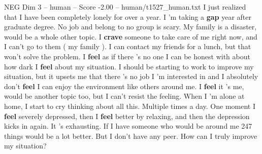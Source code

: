 \begin{textsample}{NEG Dim 3 – human – Score -2.00 – human/t1527\_human.txt}  \label{ex:f3_neg_036}
I just realized that I have been completely lonely for over a year.
I ’m taking a \textbf{gap} year after graduate degree.
No job and belong to no group is scary.
My family is a disaster, would be a whole other topic.
I \textbf{crave} someone to take care of me right now, and I can't go to them ( my family ).
I can contact my friends for a lunch, but that won't solve the problem.
I \textbf{feel} as if there ’s no one I can be honest with about how dark I \textbf{feel} about my situation.
I should be starting to work to improve my situation, but it upsets me that there ’s no job I ’m interested in and I absolutely don't \textbf{feel} I can enjoy the environment like others around me.
I \textbf{feel} it ’s me, would be another topic too, but I can't resist the feeling.
When I ’m alone at home, I start to cry thinking about all this.
Multiple times a day.
One moment I \textbf{feel} severely depressed, then I \textbf{feel} better by relaxing, and then the depression kicks in again.
It ’s exhausting.
If I have someone who would be around me 247 things would be a lot better.
But I don't have any peer.
How can I truly improve my situation?

\end{textsample}
